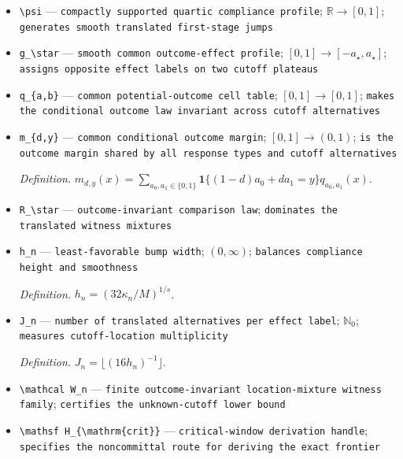 \documentclass{article}
\begin{document}
\begin{itemize}
  \item \texttt{\textbackslash{}\allowbreak{}psi} --- \texttt{compactly supported quartic compliance profile}; \(\mathbb R\to[0,1]\); \texttt{generates smooth translated first-\allowbreak{}stage jumps}
  \item \texttt{g\_\allowbreak{}\textbackslash{}\allowbreak{}star} --- \texttt{smooth common outcome-\allowbreak{}effect profile}; \([0,1]\to[-a_\star,a_\star]\); \texttt{assigns opposite effect labels on two cutoff plateaus}
  \item \texttt{q\_\allowbreak{}\{a,\allowbreak{}b\}\allowbreak{}} --- \texttt{common potential-\allowbreak{}outcome cell table}; \([0,1]\to[0,1]\); \texttt{makes the conditional outcome law invariant across cutoff alternatives}
  \item \texttt{m\_\allowbreak{}\{d,\allowbreak{}y\}\allowbreak{}} --- \texttt{common conditional outcome margin}; \([0,1]\to(0,1)\); \texttt{is the outcome margin shared by all response types and cutoff alternatives}
  \par\smallskip\noindent\emph{Definition.} \(m_{d,y}(x)=\sum_{a_0,a_1\in\{0,1\}}\mathbf 1\{(1-d)a_0+da_1=y\}q_{a_0,a_1}(x)\).
  \item \texttt{R\_\allowbreak{}\textbackslash{}\allowbreak{}star} --- \texttt{outcome-\allowbreak{}invariant comparison law}; \texttt{dominates the translated witness mixtures}
  \item \texttt{h\_\allowbreak{}n} --- \texttt{least-\allowbreak{}favorable bump width}; \((0,\infty)\); \texttt{balances compliance height and smoothness}
  \par\smallskip\noindent\emph{Definition.} \(h_n=(32\kappa_n/M)^{1/s}\).
  \item \texttt{J\_\allowbreak{}n} --- \texttt{number of translated alternatives per effect label}; \(\mathbb N_0\); \texttt{measures cutoff-\allowbreak{}location multiplicity}
  \par\smallskip\noindent\emph{Definition.} \(J_n=\lfloor(16h_n)^{-1}\rfloor\).
  \item \texttt{\textbackslash{}\allowbreak{}mathcal W\_\allowbreak{}n} --- \texttt{finite outcome-\allowbreak{}invariant location-\allowbreak{}mixture witness family}; \texttt{certifies the unknown-\allowbreak{}cutoff lower bound}
  \item \texttt{\textbackslash{}\allowbreak{}mathsf H\_\allowbreak{}\{\textbackslash{}\allowbreak{}mathrm\{crit\}\allowbreak{}\}\allowbreak{}} --- \texttt{critical-\allowbreak{}window derivation handle}; \texttt{specifies the noncommittal route for deriving the exact frontier}

\end{itemize}
\end{document}
